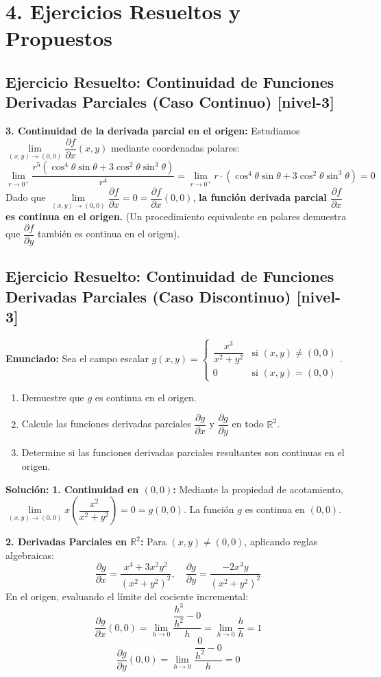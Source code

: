 \documentclass[11pt]{article}
\newenvironment{ejercicios}{%
  \section*{4. Ejercicios Resueltos y Propuestos}%
}{}
\newenvironment{ejercicioresuelto}[2]{\subsection*{Ejercicio Resuelto: #1 \small{[#2]}}}{}
\newcommand{\enunciado}[1]{\textbf{Enunciado:} #1\par\vspace{0.2cm}}
\newcommand{\solucion}[1]{\textbf{Solución:} #1\par\vspace{0.4cm}}
\begin{document}
\begin{ejercicios}
\begin{ejercicioresuelto}{Continuidad de Funciones Derivadas Parciales (Caso Continuo)}{nivel-3}
{      \textbf{3. Continuidad de la derivada parcial en el origen:}
      Estudiamos $\displaystyle \lim\limits_{(x,y)\to(0,0)} \displaystyle \dfrac{\partial f}{\partial x}(x,y)$ mediante coordenadas polares:
      $$ \displaystyle \lim\limits_{r \to 0^+} \displaystyle \dfrac{r^5(\cos^4\theta \sin\theta + 3\cos^2\theta \sin^3\theta)}{r^4} = \displaystyle \lim\limits_{r \to 0^+} r \cdot (\cos^4\theta \sin\theta + 3\cos^2\theta \sin^3\theta) = 0 $$
      Dado que $\displaystyle \lim\limits_{(x,y)\to(0,0)} \displaystyle \dfrac{\partial f}{\partial x} = 0 = \displaystyle \dfrac{\partial f}{\partial x}(0,0)$, \textbf{la función derivada parcial $\displaystyle \dfrac{\partial f}{\partial x}$ es continua en el origen.}
      (Un procedimiento equivalente en polares demuestra que $\displaystyle \dfrac{\partial f}{\partial y}$ también es continua en el origen).
    }
  \end{ejercicioresuelto}

  \begin{ejercicioresuelto}{Continuidad de Funciones Derivadas Parciales (Caso Discontinuo)}{nivel-3}
    \enunciado{
      Sea el campo escalar $g(x,y) = \begin{cases} \displaystyle \dfrac{x^3}{x^2 + y^2} & \text{si } (x,y) \neq (0,0) \\[1em] 0 & \text{si } (x,y) = (0,0) \end{cases}$.
      \begin{enumerate}
        \item Demuestre que $g$ es continua en el origen.
        \item Calcule las funciones derivadas parciales $\displaystyle \dfrac{\partial g}{\partial x}$ y $\displaystyle \dfrac{\partial g}{\partial y}$ en todo $\mathbb{R}^2$.
        \item Determine si las funciones derivadas parciales resultantes son continuas en el origen.
      \end{enumerate}
    }
    \solucion{
      \textbf{1. Continuidad en $(0,0)$:} Mediante la propiedad de acotamiento, $\displaystyle \lim\limits_{(x,y)\to(0,0)} x \left(\displaystyle \dfrac{x^2}{x^2+y^2}\right) = 0 = g(0,0)$. La función $g$ es continua en $(0,0)$.

      \textbf{2. Derivadas Parciales en $\mathbb{R}^2$:}
      Para $(x,y) \neq (0,0)$, aplicando reglas algebraicas:
      $$ \displaystyle \dfrac{\partial g}{\partial x} = \displaystyle \dfrac{x^4 + 3x^2 y^2}{(x^2+y^2)^2}, \quad \displaystyle \dfrac{\partial g}{\partial y} = \displaystyle \dfrac{-2x^3 y}{(x^2+y^2)^2} $$
      En el origen, evaluando el límite del cociente incremental:
      $$ \displaystyle \dfrac{\partial g}{\partial x}(0,0) = \displaystyle \lim\limits_{h \to 0} \displaystyle \dfrac{\displaystyle \dfrac{h^3}{h^2} - 0}{h} = \displaystyle \lim\limits_{h \to 0} \displaystyle \dfrac{h}{h} = 1 $$
      $$ \displaystyle \dfrac{\partial g}{\partial y}(0,0) = \displaystyle \lim\limits_{h \to 0} \displaystyle \dfrac{\displaystyle \dfrac{0}{h^2} - 0}{h} = 0 $$

}
\end{ejercicioresuelto}
\end{ejercicios}
\end{document}

